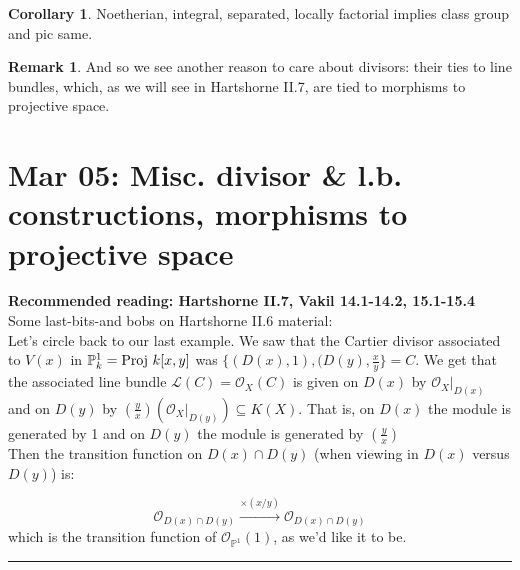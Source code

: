 \documentclass[10pt,reqno]{amsart}
\theoremstyle{definition}
\newtheorem{corollary}[theorem]{Corollary}
\newtheorem{example}[theorem]{Example}
\newtheorem{remark}[theorem]{Remark}
\theoremstyle{remark}
\numberwithin{equation}{section}
\numberwithin{theorem}{section}
\newcommand{\OO}{{\mathcal O}}
\newcommand{\proj}{\textup{Proj }}
\newcommand{\LL}{{\mathscr L}}
\newcommand{\PP}{{\mathbb P}}
\begin{document}
\begin{corollary} Noetherian, integral, separated, locally factorial implies class group and pic same.
\end{corollary}


\begin{remark} And so we see another reason to care about divisors: their ties to line bundles, which, as we will see in Hartshorne II.7, are tied to morphisms to projective space.
\end{remark}
\section{Mar 05: Misc. divisor \& l.b. constructions, morphisms to projective space}
\textbf{Recommended reading: Hartshorne II.7, Vakil 14.1-14.2, 15.1-15.4}
\\

Some last-bits-and bobs on Hartshorne II.6 material:
\\

Let's circle back to our last example. We saw that the Cartier divisor associated to $V(x)$ in $\PP^1_k = \proj k[x,y]$ was $\{(D(x),1), (D(y),\frac{x}{y}\} = C$. We get that the associated line bundle $\LL(C) = \OO_X(C)$ is given on $D(x)$ by $\OO_X|_{D(x)}$ and on $D(y)$ by $(\frac{y}{x})(\OO_X|_{D(y)}) \subseteq K(X)$. That is, on $D(x)$ the module is generated by 1 and on $D(y)$ the module is generated by $(\frac{y}{x})$
\\

Then the transition function on $D(x) \cap D(y)$ (when viewing in $D(x)$ versus $D(y)$) is:

\[\OO_{D(x) \cap D(y)} \stackrel{\times (x/y)}{\to} \OO_{D(x) \cap D(y)} \]
which is the transition function of $\OO_{\PP^1}(1)$, as we'd like it to be.
\\

\hrule
\vspace{1em}
\end{document}
